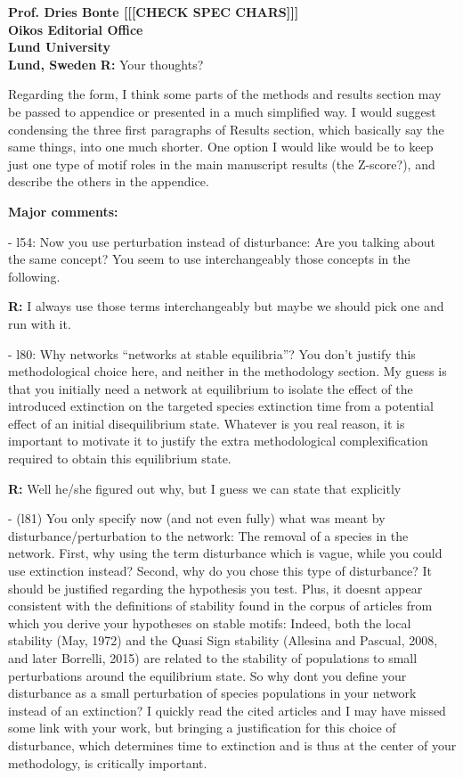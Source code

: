 \documentclass[12pt]{letter}
\begin{document}
\begin{letter}{\bf Prof. Dries Bonte [[[CHECK SPEC CHARS]]]\\
Oikos Editorial Office \\
Lund University \\
Lund, Sweden}
  \textbf{R:}
  Your thoughts?

  Regarding the form, I think some parts of the methods and results section may be passed to appendice or presented in a much simplified way. I would suggest condensing the three first paragraphs of Results section, which basically say the same things, into one much shorter. One option I would like would be to keep just one type of motif roles in the main manuscript results (the Z-score?), and describe the others in the appendice.


  \textbf{Major comments:}

    - l54: Now you use perturbation instead of disturbance: Are you talking about the same concept? You seem to use interchangeably those concepts in the following.

    \textbf{R:}
    I always use those terms interchangeably but maybe we should pick one and run with it.

    - l80: Why networks “networks at stable equilibria”? You don’t justify this methodological choice here, and neither in the methodology section. My guess is that you initially need a network at equilibrium to isolate the effect of the introduced extinction on the targeted species extinction time from a potential effect of an initial disequilibrium state. Whatever is you real reason, it is important to motivate it to justify the extra methodological complexification required to obtain this equilibrium state.

    \textbf{R:}
    Well he/she figured out why, but I guess we can state that explicitly

    - (l81) You only specify now (and not even fully) what was meant by disturbance/perturbation to the network: The removal of a species in the network. First, why using the term disturbance which is vague, while you could use extinction instead? Second, why do you chose this type of disturbance? It should be justified regarding the hypothesis you test. Plus, it doesnt appear consistent with the definitions of stability found in the corpus of articles from which you derive your hypotheses on stable motifs: Indeed, both the local stability (May, 1972) and the Quasi Sign stability (Allesina and Pascual, 2008, and later Borrelli, 2015) are related to the stability of populations to small perturbations around the equilibrium state. So why dont you define your disturbance as a small perturbation of species populations in your network instead of an extinction? I quickly read the cited articles and I may have missed some link with your work, but bringing a justification for this choice of disturbance, which determines time to extinction and is thus at the center of your methodology, is critically important.


\end{letter}
\end{document}
